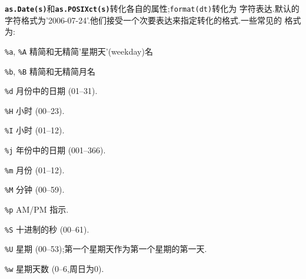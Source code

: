 \documentclass[landscape]{article}
\newcommand{\code}{\texttt}
\newcommand{\bcode}[1]{\texttt{\textbf{#1}}}
\newcommand{\describe}[1]{\begin{description}{#1}\end{description}}
\begin{document}
\begin{multicols*}{3}
\bcode{as.Date(s)}和\bcode{as.POSIXct(s)}转化各自的属性;\code{format(dt)}转化为
字符表达.默认的字符格式为'2006-07-24'.他们接受一个次要表达来指定转化的格式.一些常见的
格式为:
  \describe{
    \itemsep=0pt\parskip=0pt
    \item{\code{\%a}, \code{\%A}} {精简和无精简'星期天'(weekday)名}
    \item{\code{\%b}, \code{\%B}} {精简和无精简月名}
    \item{\code{\%d}} {月份中的日期 (01--31).}
    \item{\code{\%H}} {小时 (00--23).}
    \item{\code{\%I}} {小时 (01--12).}
    \item{\code{\%j}} {年份中的日期 (001--366).}
    \item{\code{\%m}} {月份 (01--12).}
    \item{\code{\%M}} {分钟 (00--59).}
    \item{\code{\%p}} {AM/PM 指示.}
    \item{\code{\%S}} {十进制的秒 (00--61).}
    \item{\code{\%U}} {星期 (00--53);第一个星期天作为第一个星期的第一天.}
    \item{\code{\%w}} {星期天数 (0--6,周日为0).}
}
\end{multicols*}
\end{document}
